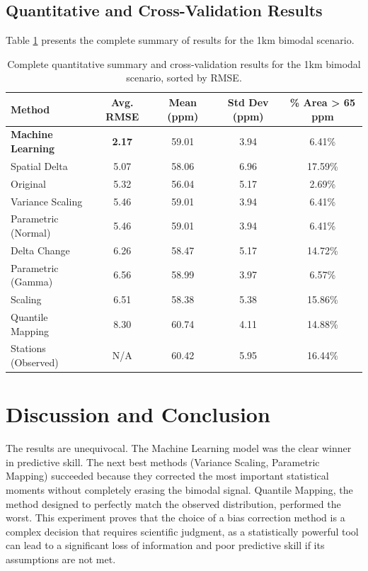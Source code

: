 \documentclass[11pt, a4paper]{article}
\begin{document}
\subsection{Quantitative and Cross-Validation Results}
Table \ref{tab:full_summary} presents the complete summary of results for the 1km bimodal scenario.

\begin{table}[h!]
\centering
\caption{Complete quantitative summary and cross-validation results for the 1km bimodal scenario, sorted by RMSE.}
\label{tab:full_summary}
\begin{tabular}{lcccc}
\toprule
\textbf{Method} & \textbf{Avg. RMSE} & \textbf{Mean (ppm)} & \textbf{Std Dev (ppm)} & \textbf{\% Area > 65 ppm} \\
\midrule
\textbf{Machine Learning} & \textbf{2.17} & 59.01 & 3.94 & 6.41\% \\
Spatial Delta & 5.07 & 58.06 & 6.96 & 17.59\% \\
Original & 5.32 & 56.04 & 5.17 & 2.69\% \\
Variance Scaling & 5.46 & 59.01 & 3.94 & 6.41\% \\
Parametric (Normal) & 5.46 & 59.01 & 3.94 & 6.41\% \\
Delta Change & 6.26 & 58.47 & 5.17 & 14.72\% \\
Parametric (Gamma) & 6.56 & 58.99 & 3.97 & 6.57\% \\
Scaling & 6.51 & 58.38 & 5.38 & 15.86\% \\
Quantile Mapping & 8.30 & 60.74 & 4.11 & 14.88\% \\
\midrule
Stations (Observed) & N/A & 60.42 & 5.95 & 16.44\% \\
\bottomrule
\end{tabular}
\end{table}

\section{Discussion and Conclusion}

The results are unequivocal. The Machine Learning model was the clear winner in predictive skill. The next best methods (Variance Scaling, Parametric Mapping) succeeded because they corrected the most important statistical moments without completely erasing the bimodal signal. Quantile Mapping, the method designed to perfectly match the observed distribution, performed the worst. This experiment proves that the choice of a bias correction method is a complex decision that requires scientific judgment, as a statistically powerful tool can lead to a significant loss of information and poor predictive skill if its assumptions are not met.
\end{document}
